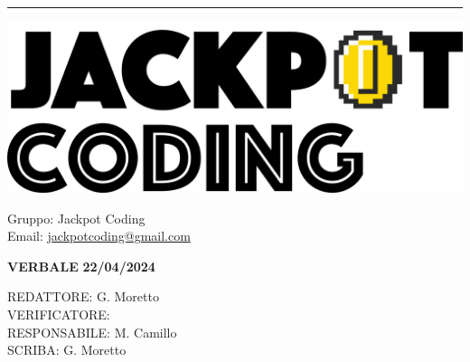 \documentclass[5pt]{article}
\begin{document}
\hrule
\begin{minipage}[t]{0.50\textwidth}
    \begin{flushleft}
        \hspace{10pt}
        \includegraphics[scale=0.65]{jackpot-logo.png} 
    \end{flushleft}
\end{minipage}
\hspace{-60pt} %
\begin{flushright}
    \begin{minipage}[t]{0.50\textwidth}
        \begin{flushright}
            Gruppo: {\Large Jackpot Coding}\\
            Email: \href{mailto:jackpotcoding@gmail.com}{jackpotcoding@gmail.com}
        \end{flushright}
    \end{minipage}
\end{flushright}

\vspace{15pt}

\begin{center}
    \textbf{\large VERBALE }
    \textbf{\large 22/04/2024} \\
    \textbf{\Large}
\end{center}

\vspace{13pt}

\begin{flushleft}
    \begin{spacing}{1.5}
        REDATTORE:  G. Moretto\\
        VERIFICATORE:  \\%
        RESPONSABILE: M. Camillo\\%
        \vspace{7pt}
        SCRIBA: G. Moretto\\%
    \end{spacing}
\end{flushleft}
\end{document}
